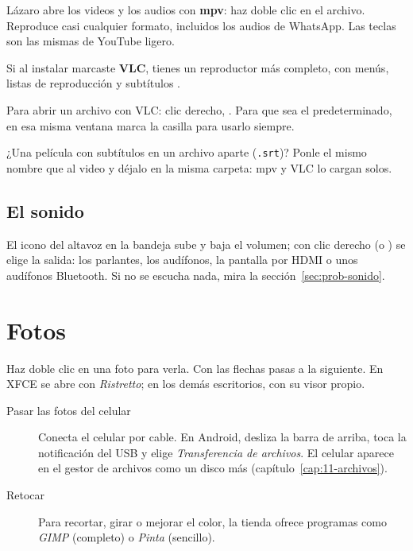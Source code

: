 Lázaro abre los videos y los audios con \textbf{mpv}: haz doble clic en el
archivo. Reproduce casi cualquier formato, incluidos los audios de
WhatsApp. Las teclas son las mismas de YouTube ligero.

Si al instalar marcaste \textbf{VLC}, tienes un reproductor más completo,
con menús, listas de reproducción y subtítulos \cite{vlc}.

 Para abrir un
archivo con VLC: clic derecho, . Para que sea el
predeterminado, en esa misma ventana marca la casilla para usarlo siempre.

\begin{consejo}
¿Una película con subtítulos en un archivo aparte (\texttt{.srt})? Ponle el
mismo nombre que al video y déjalo en la misma carpeta: mpv y VLC lo
cargan solos.
\end{consejo}

\subsection{El sonido}
El icono del altavoz en la bandeja sube y baja el volumen; con clic
derecho (o ) se elige la salida: los
parlantes, los audífonos, la pantalla por HDMI o unos audífonos
Bluetooth. Si no se escucha nada, mira la sección~\ref{sec:prob-sonido}.

\section{Fotos}

Haz doble clic en una foto para verla. Con las flechas pasas a la
siguiente. En XFCE se abre con \emph{Ristretto}; en los demás escritorios,
con su visor propio.


\begin{description}
  \item[Pasar las fotos del celular] Conecta el celular por cable. En
    Android, desliza la barra de arriba, toca la notificación del USB y
    elige \emph{Transferencia de archivos}. El celular aparece en el
    gestor de archivos como un disco más (capítulo~\ref{cap:11-archivos}).
  \item[Retocar] Para recortar, girar o mejorar el color, la tienda
    ofrece programas como \emph{GIMP} (completo) o \emph{Pinta} (sencillo).
\end{description}


